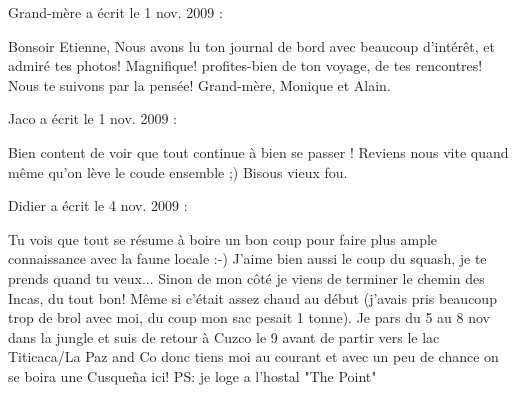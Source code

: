 \medskip
Grand-mère a écrit le 1 nov. 2009 :
\begin{displayquote}
Bonsoir Etienne,
Nous avons lu ton journal de bord avec beaucoup d'intérêt, et admiré tes photos! Magnifique! profites-bien de ton voyage, de tes rencontres! Nous te suivons par la pensée!
Grand-mère, Monique et Alain.
\end{displayquote}

\medskip
Jaco a écrit le 1 nov. 2009 :
\begin{displayquote}
Bien content de voir que tout continue à bien se passer !
Reviens nous vite quand même qu'on lève le coude ensemble ;)
Bisous vieux fou.
\end{displayquote}

\medskip
Didier a écrit le 4 nov. 2009 :
\begin{displayquote}
Tu vois que tout se résume à boire un bon coup pour faire plus ample connaissance avec la faune locale :-)
J'aime bien aussi le coup du squash, je te prends quand tu veux...
Sinon de mon côté je viens de terminer le chemin des Incas, du tout bon! Même si c'était assez chaud au début (j'avais pris beaucoup trop de brol avec moi, du coup mon sac pesait 1 tonne).
Je pars du 5 au 8 nov dans la jungle et suis de retour à Cuzco le 9 avant de partir vers le lac Titicaca/La Paz and Co donc tiens moi au courant et avec un peu de chance on se boira une Cusqueña ici!
PS: je loge a l'hostal "The Point"
\end{displayquote}

\vfill
